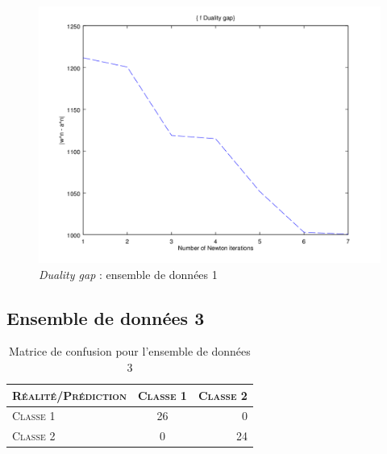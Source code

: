 \documentclass{article}
\begin{document}
         \begin{figure}[H]
           \begin{center}
             \includegraphics[scale=0.5]{images/duality11.png}
             \caption{\emph{Duality gap} : ensemble de données 1}
           \end{center}
         \end{figure}

\subsection{Ensemble de données 3}

     \begin{table}[H]
       \caption{Matrice de confusion pour l'ensemble de données 3}
       \begin{tabular}{|l|c|r|}
         \hline
         \textsc{Réalité/Prédiction} & \textsc{Classe 1} & \textsc{Classe 2}\\
         \hline
         \textsc{Classe 1} & 26 & 0\\
         \hline
         \textsc{Classe 2} & 0 & 24\\
         \hline
       \end{tabular}
     \end{table}
\end{document}
